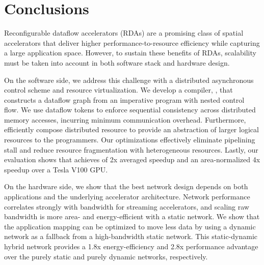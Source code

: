 \chapter{Conclusions} \label{sec:conclusion}

Reconfigurable dataflow accelerators (RDAs) are a promising class of spatial accelerators that deliver higher performance-to-resource efficiency while capturing a large application space.
However, to sustain these benefits of RDAs, scalability must be taken into account in both software
stack and hardware design.

On the software side, we address this challenge with a distributed asynchronous control scheme and resource
virtualization.
We develop a compiler, \name{}, that constructs a dataflow graph from an imperative program with nested
control flow. We use dataflow tokens to enforce sequential consistency across distributed memory
accesses, incurring minimum communication overhead.
Furthermore, \name efficiently compose distributed resource to provide an abstraction of larger
logical resources to the programmers.
Our optimizations effectively eliminate pipelining stall and reduce resource fragmentation with
heterogeneous resources.
Lastly, our evaluation shows that \name{} achieves of 2x averaged speedup and an area-normalized 4x
speedup over a Tesla V100 GPU.

On the hardware side, we show that the best network design depends on both applications and the underlying accelerator architecture.
Network performance correlates strongly with bandwidth for streaming accelerators, and scaling raw bandwidth is more area- and energy-efficient with a static network.
We show that the application mapping can be optimized to move less data by using a dynamic network as a fallback from a high-bandwidth static network.
This static-dynamic hybrid network provides a 1.8x energy-efficiency and
2.8x performance advantage over the purely static and purely dynamic networks, respectively.


